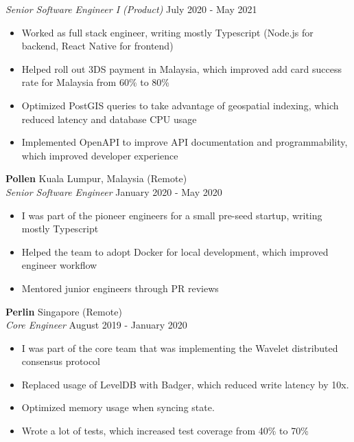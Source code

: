 \documentclass[a4paper]{article}
\begin{document}
\textit{Senior Software Engineer I (Product)} \hfill July 2020 - May 2021\\
\vspace{-1mm}
\begin{itemize} \itemsep 1pt
	\item Worked as full stack engineer, writing mostly Typescript (Node.js for backend, React Native for frontend)
	\item Helped roll out 3DS payment in Malaysia, which improved add card success rate for Malaysia from 60\% to 80\%
	\item Optimized PostGIS queries to take advantage of geospatial indexing, which reduced latency and database CPU usage
	\item Implemented OpenAPI to improve API documentation and programmability, which improved developer experience
\end{itemize}

\pagebreak

\textbf{Pollen} \hfill Kuala Lumpur, Malaysia (Remote)\\
\textit{Senior Software Engineer} \hfill January 2020 - May 2020\\
\vspace{-1mm}
\begin{itemize} \itemsep 1pt
	\item I was part of the pioneer engineers for a small pre-seed startup, writing mostly Typescript
	\item Helped the team to adopt Docker for local development, which improved engineer workflow
	\item Mentored junior engineers through PR reviews
\end{itemize}

\textbf{Perlin} \hfill Singapore (Remote)\\
\textit{Core Engineer} \hfill August 2019 - January 2020\\
\vspace{-1mm}
\begin{itemize} \itemsep 1pt
	\item I was part of the core team that was implementing the Wavelet distributed consensus protocol
	\item Replaced usage of LevelDB with Badger, which reduced write latency by 10x.
	\item Optimized memory usage when syncing state.
	\item Wrote a lot of tests, which increased test coverage from 40\% to 70\%
\end{itemize}
\end{document}
